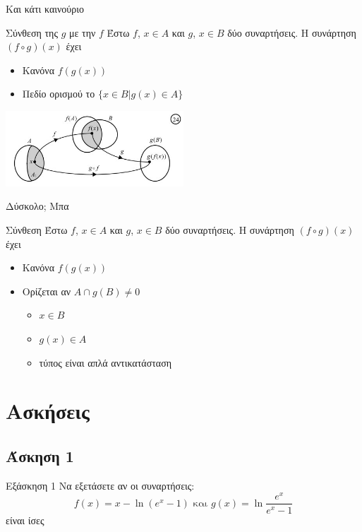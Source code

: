 \documentclass[greek]{beamer}
\begin{document}
\begin{frame}{Και κάτι καινούριο}
      \begin{block}{Σύνθεση της $g$ με την $f$}
            Έστω $f$, $x\in Α$ και $g$, $x\in Β$ δύο συναρτήσεις. Η συνάρτηση $(f\circ g)(x)$ έχει
            \begin{itemize}
                  \item Κανόνα $f(g(x))$
                  \item Πεδίο ορισμού το $\{x\in Β | g(x)\in Α \}$
            \end{itemize}
      \end{block}
      \centering
      \includegraphics[width=0.5\textwidth]{"images/1.2 Σύνθεση.png"}
\end{frame}

\begin{frame}{Δύσκολο; Μπα}
      \begin{block}{Σύνθεση}
            Έστω $f$, $x\in Α$ και $g$, $x\in Β$ δύο συναρτήσεις. Η συνάρτηση $(f\circ g)(x)$ έχει
            \begin{itemize}
                  \item Κανόνα $f(g(x))$
                  \item Ορίζεται αν $Α\cap g(Β)\ne 0$
                        \begin{itemize}
                              \item<2-> $x\in Β$
                              \item<3-> $g(x)\in Α$
                              \item<4-> τύπος είναι απλά αντικατάσταση
                        \end{itemize}
            \end{itemize}
      \end{block}
\end{frame}

\section{Ασκήσεις}

\subsection{Άσκηση 1}
\begin{frame}[label=Άσκηση1,t]{Εξάσκηση 1}
      Να εξετάσετε αν οι συναρτήσεις:
      $$f(x)=x-\ln (e^x-1) \text{ και } g(x)=\ln\frac{e^x}{e^x-1}$$
      είναι ίσες

\end{frame}
\end{document}
